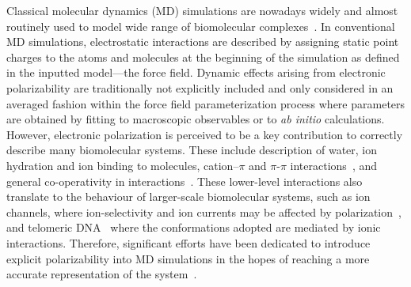 \documentclass[journal=jctcce,manuscript=article,layout=singlecolumn]{achemso}
\begin{document}
 
Classical molecular dynamics (MD) simulations are nowadays widely and almost routinely used to model wide range of biomolecular complexes~\cite{gupta22}. In conventional MD simulations, electrostatic interactions are described by assigning static point charges to the atoms and molecules at the beginning of the simulation as defined in the inputted model---the force field. Dynamic effects arising from electronic polarizability are traditionally not explicitly included and only considered in an averaged fashion within the force field parameterization process where parameters are obtained by fitting to macroscopic observables or to \textit{ab initio} calculations. However, electronic polarization is perceived to be a key contribution to correctly describe many biomolecular systems. These include description of water, ion hydration and ion binding to molecules, cation--$\pi$ and $\pi$-$\pi$ interactions~\cite{inakollu2020polarisable}, and general co-operativity in interactions~\cite{nochebuena23}. These lower-level interactions also translate to the behaviour of larger-scale biomolecular systems, such as ion channels, where ion-selectivity and ion currents may be affected by polarization~\cite{roux2011ion, klesse2020induced, prajapati2020computational,Yue2022}, and telomeric DNA~\cite{Salsbury22} where the conformations adopted are mediated by ionic interactions. Therefore, significant efforts have been dedicated to introduce explicit polarizability into MD simulations in the hopes of reaching a more accurate representation of the system~\cite{Thole1981,ando2001stable,Grossfield2003,lamoreux2003,Antila2013,Lemkul2016,baker2015polarizable,jing2019polarizable}.
\end{document}
